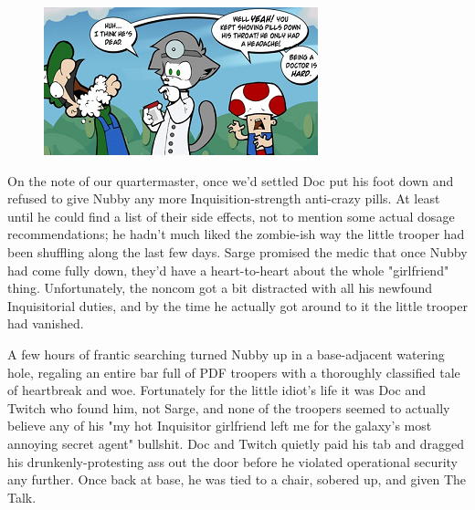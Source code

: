 \begin{figure}
	\begin{center}
		\includegraphics[width=\figwidth]{pics/19/21.png}
	\end{center}
\end{figure}
On the note of our quartermaster, once we'd settled Doc put his foot down and refused to give Nubby any more Inquisition-strength anti-crazy pills. 
At least until he could find a list of their side effects, not to mention some actual dosage recommendations; 
he hadn't much liked the zombie-ish way the little trooper had been shuffling along the last few days. 
Sarge promised the medic that once Nubby had come fully down, they'd have a heart-to-heart about the whole "girlfriend" thing. 
Unfortunately, the noncom got a bit distracted with all his newfound Inquisitorial duties, and by the time he actually got around to it the little trooper had vanished.

A few hours of frantic searching turned Nubby up in a base-adjacent watering hole, regaling an entire bar full of PDF troopers with a thoroughly classified tale of heartbreak and woe. 
Fortunately for the little idiot's life it was Doc and Twitch who found him, not Sarge, and none of the troopers seemed to actually believe any of his "my hot Inquisitor girlfriend left me for the galaxy's most annoying secret agent" bullshit. 
Doc and Twitch quietly paid his tab and dragged his drunkenly-protesting ass out the door before he violated operational security any further. 
Once back at base, he was tied to a chair, sobered up, and given The Talk.

